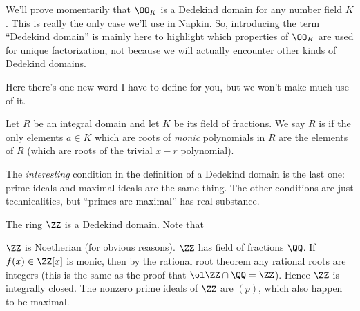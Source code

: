 \begin{remark}
	We'll prove momentarily that
	$\OO_K$ is a Dedekind domain for any number field $K$.
	This is really the only case we'll use in Napkin.
	So, introducing the term ``Dedekind domain'' is mainly here to highlight
	which properties of $\OO_K$ are used for unique factorization,
	not because we will actually encounter other kinds of Dedekind domains.
\end{remark}

Here there's one new word I have to define for you, but we won't make much use of it.
\begin{definition}
	Let $R$ be an integral domain and let $K$ be its field of fractions.
	We say $R$ is  if
	the only elements $a \in K$ which are roots of \emph{monic} polynomials in $R$
	are the elements of $R$ (which are roots of the trivial $x-r$ polynomial).
\end{definition}
The \emph{interesting} condition in the definition
of a Dedekind domain is the last one: prime ideals and maximal ideals
are the same thing.
The other conditions are just technicalities,
but ``primes are maximal'' has real substance.
\begin{example}
	The ring $\ZZ$ is a Dedekind domain.
	Note that
	\begin{itemize}
		\ii $\ZZ$ is Noetherian (for obvious reasons).
		\ii $\ZZ$ has field of fractions $\QQ$.
		If $f(x) \in \ZZ[x]$ is monic, then by the rational root theorem
		any rational roots are integers
		(this is the same as the proof that $\ol\ZZ \cap \QQ = \ZZ$).
		Hence $\ZZ$ is integrally closed.
		\ii The nonzero prime ideals of $\ZZ$ are $(p)$,
		which also happen to be maximal.
	\end{itemize}
\end{example}

